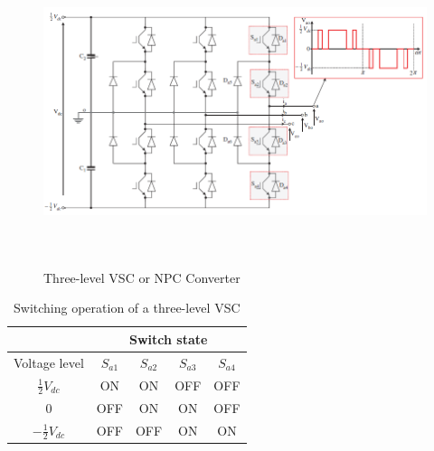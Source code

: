 \begin{figure}[H]
\centering
    \includegraphics[height = 9cm,width = \textwidth]{Diagrams/Chapter_2/3levelVSC.PNG}
    \caption{Three-level VSC or NPC Converter \cite{noauthor_appendix_2014}}
    \label{fig:3levelVSC}
\end{figure}

\begin{table}[H]
\centering
\begin{tabular}{c|c|c|c|c|}
\cline{2-5}
                                          & \multicolumn{4}{c|}{Switch state}     \\ \hline
\multicolumn{1}{|c|}{Voltage level}       & $S_{a1}$ & $S_{a2}$ & $S_{a3}$ & $S_{a4}$ \\ \hline
\multicolumn{1}{|c|}{$\frac{1}{2}V_{dc}$}  & ON      & ON      & OFF     & OFF     \\ \hline
\multicolumn{1}{|c|}{0}                   & OFF     & ON      & ON      & OFF     \\ \hline
\multicolumn{1}{|c|}{$-\frac{1}{2}V_{dc}$} & OFF     & OFF     & ON      & ON      \\ \hline
\end{tabular}
\caption{Switching operation of a three-level VSC \cite{noauthor_appendix_2014}}
\label{tab:3level_switching}
\end{table}

